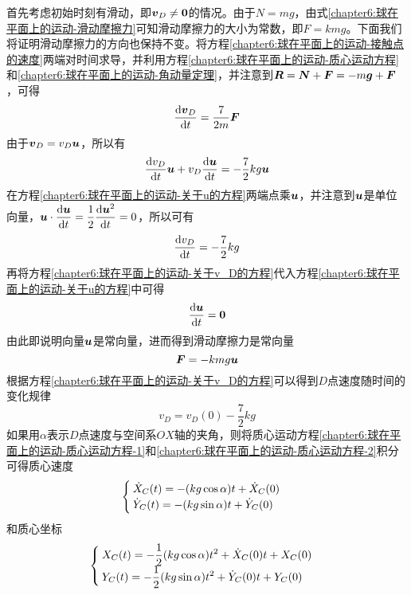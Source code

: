 首先考虑初始时刻有滑动，即$\boldsymbol{v}_D\neq \boldsymbol{0}$的情况。由于$N=mg$，由式\eqref{chapter6:球在平面上的运动-滑动摩擦力}可知滑动摩擦力的大小为常数，即$F=kmg$。下面我们将证明滑动摩擦力的方向也保持不变。将方程\eqref{chapter6:球在平面上的运动-接触点的速度}两端对时间求导，并利用方程\eqref{chapter6:球在平面上的运动-质心运动方程}和\eqref{chapter6:球在平面上的运动-角动量定理}，并注意到$\boldsymbol{R}=\boldsymbol{N}+\boldsymbol{F}=-m\boldsymbol{g}+\boldsymbol{F}$，可得
\begin{equation}
	\dfrac{\mathrm{d} \boldsymbol{v}_D}{\mathrm{d} t} = \frac{7}{2m}\boldsymbol{F}
	\label{chapter6:球在平面上的运动-关于v_D的方程-向量形式}
\end{equation}
由于$\boldsymbol{v}_D=v_D\boldsymbol{u}$，所以有
\begin{equation}
	\dfrac{\mathrm{d} v_D}{\mathrm{d} t}\boldsymbol{u} + v_D\dfrac{\mathrm{d} \boldsymbol{u}}{\mathrm{d} t} = -\frac72kg\boldsymbol{u}
	\label{chapter6:球在平面上的运动-关于u的方程}
\end{equation}
在方程\eqref{chapter6:球在平面上的运动-关于u的方程}两端点乘$\boldsymbol{u}$，并注意到$\boldsymbol{u}$是单位向量，$\boldsymbol{u}\cdot\dfrac{\mathrm{d} \boldsymbol{u}}{\mathrm{d} t} = \dfrac12\dfrac{\mathrm{d} \boldsymbol{u}^2}{\mathrm{d} t}=0$，所以可有
\begin{equation}
	\dfrac{\mathrm{d} v_D}{\mathrm{d} t} = -\frac72kg
	\label{chapter6:球在平面上的运动-关于v_D的方程}
\end{equation}
再将方程\eqref{chapter6:球在平面上的运动-关于v_D的方程}代入方程\eqref{chapter6:球在平面上的运动-关于u的方程}中可得
\begin{equation}
	\dfrac{\mathrm{d} \boldsymbol{u}}{\mathrm{d} t} = \boldsymbol{0}
\end{equation}
由此即说明向量$\boldsymbol{u}$是常向量，进而得到滑动摩擦力是常向量
\begin{equation}
	\boldsymbol{F} = -kmg\boldsymbol{u}
\end{equation}
根据方程\eqref{chapter6:球在平面上的运动-关于v_D的方程}可以得到$D$点速度随时间的变化规律
\begin{equation}
	v_D = v_D(0)-\frac72kg
\end{equation}
如果用$\alpha$表示$D$点速度与空间系$OX$轴的夹角，则将质心运动方程\eqref{chapter6:球在平面上的运动-质心运动方程-1}和\eqref{chapter6:球在平面上的运动-质心运动方程-2}积分可得质心速度
\begin{equation}
\begin{cases}
	\displaystyle \dot{X}_C(t) = -(kg\cos\alpha) t + \dot{X}_C(0) \\
	\displaystyle \dot{Y}_C(t) = -(kg\sin\alpha) t + \dot{Y}_C(0)
\end{cases}
\end{equation}
和质心坐标
\begin{equation}
\begin{cases}
	\displaystyle X_C(t) = -\frac12 (kg\cos\alpha) t^2 + \dot{X}_C(0)t + X_C(0) \\
	\displaystyle Y_C(t) = -\frac12 (kg\sin\alpha) t^2 + \dot{Y}_C(0)t + Y_C(0)
\end{cases}
\label{chapter6:球在平面上的运动-质心运动}
\end{equation}
